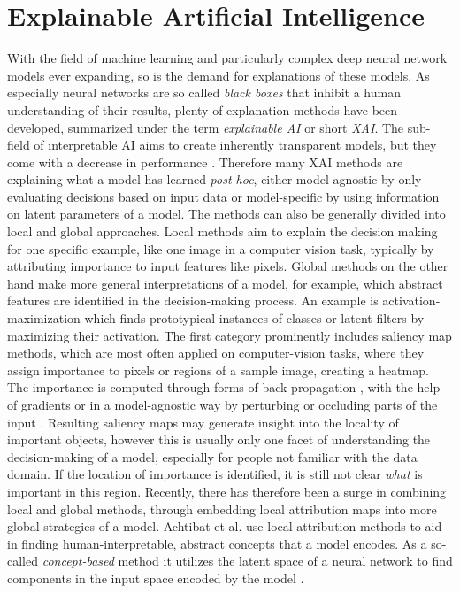 \section{Explainable Artificial Intelligence}
With the field of machine learning and particularly complex deep neural network models ever expanding, so is the demand for explanations of these models.
As especially neural networks are so called \textit{black boxes} that inhibit a human understanding of their results, plenty of explanation methods have been developed, summarized under the term \textit{explainable AI} or short \textit{XAI}. The sub-field of interpretable AI aims to create inherently transparent models, but they come with a decrease in performance \cite{Lipton2018}. Therefore many XAI methods are explaining what a model has learned \textit{post-hoc}, either model-agnostic by only evaluating decisions based on input data or model-specific by using information on latent parameters of a model.
The methods can also be generally divided into local and global approaches. Local methods aim to explain the decision making for one specific example, like one image in a computer vision task, typically by attributing importance to input features like pixels. Global methods on the other hand make more general interpretations of a model, for example, which abstract features are identified in the decision-making process. An example is activation-maximization \cite{Nguyen2016} which finds prototypical instances of classes or latent filters by maximizing their activation. 
The first category prominently includes saliency map methods, which are most often applied on computer-vision tasks, where they assign importance to pixels or regions of a sample image, creating a heatmap. The importance is computed through forms of back-propagation \cite{Bach2015,Zhang2016,Kindermans2017}, with the help of gradients \cite{Sundararajan2017,Smilkov2017} or in a model-agnostic way by perturbing or occluding parts of the input \cite{Lundberg2017,Zeiler2013,Zintgraf2017,Agarwal2020}. Resulting saliency maps may generate insight into the locality of important objects, however this is usually only one facet of understanding the decision-making of a model, especially for people not familiar with the data domain. If the location of importance is identified, it is still not clear \textit{what} is important in this region.   Recently, there has therefore been a surge in combining local and global methods, through embedding local attribution maps into more global strategies of a model. Achtibat et al. \cite{Achtibat2022} use local attribution methods to aid in finding human-interpretable, abstract concepts that a model encodes. As a so-called \textit{concept-based} method it utilizes the latent space of a neural network to find components in the input space encoded by the model \cite{Bau2017,Bau2020,Kim2018, Ghorbani2019, Zhang2021, Fel2023a}. 

